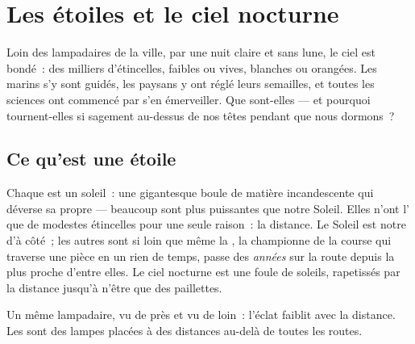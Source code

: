 \chapter{Les étoiles et le ciel nocturne}\label{ch:g5:stars-night-sky}

Loin des lampadaires de la ville, par une nuit claire et sans lune,
le ciel est bondé~: des milliers d'étincelles, faibles ou vives,
blanches ou orangées. Les marins s'y sont guidés, les paysans y ont
réglé leurs semailles, et toutes les sciences ont commencé par s'en
émerveiller. Que sont-elles --- et pourquoi tournent-elles si
sagement au-dessus de nos têtes pendant que nous dormons~?

\section{Ce qu'est une étoile}

\begin{example}\label{ex:g5:stars-night-sky:suns}
Chaque  est un soleil~: une gigantesque boule de matière
incandescente qui déverse sa propre  --- beaucoup sont plus
puissantes que notre Soleil. Elles n'ont l' que de modestes
étincelles pour une seule raison~: la distance. Le Soleil est notre
 d'à côté~; les autres sont si loin que même la , la
championne de la course qui traverse une pièce en un rien de temps,
passe des \emph{années} sur la route depuis la plus proche d'entre
elles. Le ciel nocturne est une foule de soleils, rapetissés par la
distance jusqu'à n'être que des paillettes.
\end{example}

\begin{omfigure}

{\small Un même lampadaire, vu de près et vu de loin~: l'éclat
faiblit avec la distance. Les  sont des lampes placées à des
distances au-delà de toutes les routes.}
\end{omfigure}

